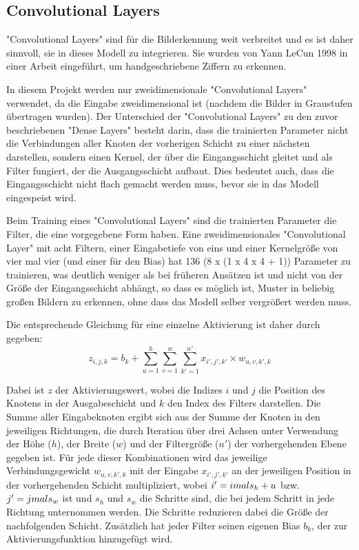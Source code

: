 \subsection{Convolutional Layers}

"Convolutional Layers" sind für die Bilderkennung weit verbreitet und es ist daher sinnvoll, sie in dieses Modell zu integrieren.
Sie wurden von Yann LeCun 1998 in einer Arbeit \cite{Lecun1998} eingeführt, um handgeschriebene Ziffern zu erkennen.

In diesem Projekt werden nur zweidimensionale "Convolutional Layers" verwendet, da die Eingabe zweidimensional ist (nachdem die Bilder in Graustufen übertragen wurden).
Der Unterschied der "Convolutional Layers" zu den zuvor beschriebenen "Dense Layers" besteht darin, dass die trainierten Parameter nicht die Verbindungen aller Knoten der vorherigen Schicht zu einer nächsten darstellen, sondern einen Kernel, der über die Eingangsschicht gleitet und als Filter fungiert, der die Ausgangsschicht aufbaut.
Dies bedeutet auch, dass die Eingangsschicht nicht flach gemacht werden muss, bevor sie in das Modell eingespeist wird.

Beim Training eines "Convolutional Layers" sind die trainierten Parameter die Filter, die eine vorgegebene Form haben.
Eine zweidimensionales "Convolutional Layer" mit acht Filtern, einer Eingabetiefe von eins und einer Kernelgröße von vier mal vier (und einer für den Bias) hat 136 (8 x (1 x 4 x 4 + 1)) Parameter zu trainieren, was deutlich weniger als bei früheren Ansätzen ist und nicht von der Größe der Eingangsschicht abhängt, so dass es möglich ist, Muster in beliebig großen Bildern zu erkennen, ohne dass das Modell selber vergrößert werden muss.

Die entsprechende Gleichung für eine einzelne Aktivierung ist daher durch \cite[S. 453]{Geron2019} gegeben:
\begin{equation}
    z_{i,j,k} = b_k + \sum_{u=1}^{h} \sum_{v=1}^{w} \sum_{k'=1}^{n'} x_{i', j', k'} \times w_{u, v, k', k} 
\end{equation}

Dabei ist $z$ der Aktivierungswert, wobei die Indizes $i$ und $j$ die Position des Knotens in der Ausgabeschicht und $k$ den Index des Filters darstellen.
Die Summe aller Eingabeknoten ergibt sich aus der Summe der Knoten in den jeweiligen Richtungen, die durch Iteration über drei Achsen unter Verwendung der Höhe ($h$), der Breite ($w$) und der Filtergröße ($n'$) der vorhergehenden Ebene gegeben ist.
Für jede dieser Kombinationen wird das jeweilige Verbindungsgewicht $w_{u, v, k', k}$ mit der Eingabe $x_{i', j', k'}$ an der jeweiligen Position in der vorhergehenden Schicht multipliziert, wobei $i' = i \-mal s_h + u$ bzw. $j' = j \-mal s_w$ ist und $s_h$ und $s_w$ die Schritte sind, die bei jedem Schritt in jede Richtung unternommen werden. Die Schritte reduzieren dabei die Größe der nachfolgenden Schicht.
Zusätzlich hat jeder Filter seinen eigenen Bias $b_k$, der zur Aktivierungsfunktion hinzugefügt wird.

